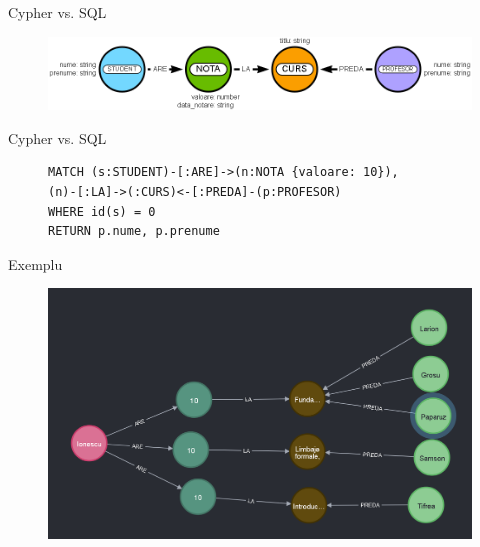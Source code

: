\documentclass{beamer}
\begin{document}
\begin{frame}[fragile]{Cypher vs. SQL}
    \begin{figure}[H]
        \centering
        \begin{adjustbox}{max size={\textwidth}{\textheight}}
        \includegraphics[scale = 0.4]{exemplu_2}
        \end{adjustbox}
    \end{figure}
\end{frame}

\begin{frame}[fragile]{Cypher vs. SQL}
    \centering
    \begin{figure}[H]
\centering
\begin{BVerbatim}
MATCH (s:STUDENT)-[:ARE]->(n:NOTA {valoare: 10}),
(n)-[:LA]->(:CURS)<-[:PREDA]-(p:PROFESOR)
WHERE id(s) = 0
RETURN p.nume, p.prenume
\end{BVerbatim}
\end{figure}
\end{frame}

\begin{frame}[fragile]{Exemplu}
    \begin{figure}[H]
        \centering
        \begin{adjustbox}{max size={\textwidth}{\textheight}}
        \includegraphics[scale = 0.4]{exemplu_3}
        \end{adjustbox}
    \end{figure}
\end{frame}
\end{document}
